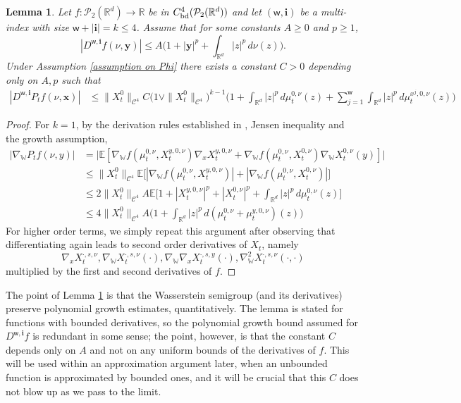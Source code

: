 \documentclass[11pt,reqno]{amsart}
\numberwithin{equation}{section}
\newtheorem{lemma}[theorem]{Lemma}
\theoremstyle{definition}
\def\E{{\mathbb E}}
\def\R{{\mathbb R}}
\newcommand{\wgrad}{\nabla_{\W}}
\newcommand{\W}{\mathbb W}
\begin{document}
\begin{lemma} 
\label{lm: bounds onf wgrad semigroup}
 Let $f:\mathcal P_2(\R^d)\to \R$ be in $C_{\textup{bd}}^4(\mathcal P_2(\R^d))$ and let $(\mathsf w,\boldsymbol{i})$ be a multi-index with size $\mathsf w+|\boldsymbol{i}|=k\leq 4$. Assume that for some constants $A \ge 0$ and $p\geq 1$,
 \begin{equation*}
     |D^{\mathsf w,\boldsymbol{i}} f(\nu,\boldsymbol{y})|\leq A\Big(1+ |\boldsymbol{y}|^p+\int_{\R^d}|z|^p\,d\nu(z)\Big).
 \end{equation*}
    Under Assumption \ref{assumption on Phi} there exists a constant $C>0$ depending only on $A,p$ such that 
    \begin{align*}
        |D^{\mathsf w,\boldsymbol{i}} P_t f(\nu,\boldsymbol{x})|&\leq \|X^0_t\|_{\mathcal{C}^4}C\big(1 \vee \|X^0_t\|_{\mathcal{C}^4}\big)^{k-1} \Big(1+\int_{\R^d} |z|^p\,d\mu_t^{0,\nu}(z)+\sum_{j=1}^{\boldsymbol{\mathsf w }}\int_{\R^d} |z|^p\,d\mu_t^{x^j,0,\nu}(z)\Big)
    \end{align*}
\end{lemma}
\begin{proof} 
    For $k=1$, by the derivation rules established in \cite[Lemma 6.1]{Buckdahn2017-op}, Jensen inequality and the growth assumption,
    \begin{align*}
        |\wgrad P_t f(\nu,y)|&= \Big|\E[\wgrad f(\mu_t^{0,\nu}, X_t^{y,0,\nu}) \nabla_x X_t^{y,0,\nu}+\wgrad f(\mu_t^{0,\nu},X_t^{0,\nu}) \wgrad X_t^{0,\nu}(y) ]\Big|\\
        &\leq \|X^0_t\|_{\mathcal{C}^4}\E\big[|\wgrad f(\mu_t^{0,\nu},X_t^{y,0,\nu})|+|\wgrad f(\mu_t^{0,\nu},X_t^{0,\nu})|\big]\\
        &\leq 2\|X^0_t\|_{\mathcal{C}^4}A\E\Big[1+|X_t^{y,0,\nu}|^p+|X_t^{0,\nu}|^p+\int_{\R^d}|z|^p\,d\mu_t^{0,\nu}(z)\Big]\\
        &\leq 4\|X^0_t\|_{\mathcal{C}^4}A\Big(1+\int_{\R^d}|z|^p\,d(\mu_t^{0,\nu}+\mu_t^{y,0,\nu})(z)\Big)
    \end{align*}
    For higher order terms, we simply repeat this argument after observing that differentiating again leads to second order derivatives of $X_t$, namely \[ \nabla_x X_t^{\cdot,s,\nu},\wgrad X_t^{\cdot,s,\nu}(\cdot), \wgrad \nabla_x X_t^{\cdot,s,y}(\cdot), \wgrad^2 X_t^{\cdot,s,\nu}(\cdot,\cdot)\]
    multiplied by the first and second derivatives of $f$.
\end{proof}
The point of Lemma \ref{lm: bounds onf wgrad semigroup} is that the Wasserstein semigroup (and its derivatives) preserve polynomial growth estimates, quantitatively. The lemma is stated for functions with bounded derivatives, so the polynomial growth bound assumed for $D^{\mathsf w,\boldsymbol{i}} f$ is redundant in some sense; the point, however, is that the constant $C$ depends only on $A$ and not on any uniform bounds of the derivatives of $f$. This will be used within an approximation argument later, when an unbounded function is approximated by bounded ones, and it will be crucial that this $C$ does not blow up as we pass to the limit. 
\end{document}
